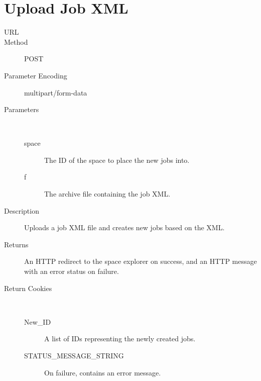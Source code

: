 \section{Upload Job XML}
\begin{description}
\item [URL] 
\item [Method] POST
\item [Parameter Encoding] multipart/form-data
\item [Parameters] \
	\begin{description}
	\item [space]  The ID of the space to place the new jobs into.
	\item [f] \type{File} The archive file containing the job XML.
	\end{description}
\item [Description] Uploads a job XML file and creates new jobs based on the XML.
\item [Returns] An HTTP redirect to the space explorer on success, and an HTTP message with an error status on failure.
\item [Return Cookies] \
	\begin{description}
	\item [New\_ID]  A list of IDs representing the newly created jobs.
	\item [STATUS\_MESSAGE\_STRING]  On failure, contains an error message.
	\end{description}
\end{description}


